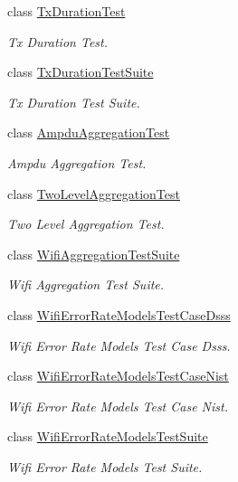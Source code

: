 \begin{DoxyCompactItemize}
class \hyperlink{classTxDurationTest}{Tx\+Duration\+Test}
\begin{DoxyCompactList}\small\item\em Tx Duration Test. \end{DoxyCompactList}\item 
class \hyperlink{classTxDurationTestSuite}{Tx\+Duration\+Test\+Suite}
\begin{DoxyCompactList}\small\item\em Tx Duration Test Suite. \end{DoxyCompactList}\item 
class \hyperlink{classAmpduAggregationTest}{Ampdu\+Aggregation\+Test}
\begin{DoxyCompactList}\small\item\em Ampdu Aggregation Test. \end{DoxyCompactList}\item 
class \hyperlink{classTwoLevelAggregationTest}{Two\+Level\+Aggregation\+Test}
\begin{DoxyCompactList}\small\item\em Two Level Aggregation Test. \end{DoxyCompactList}\item 
class \hyperlink{classWifiAggregationTestSuite}{Wifi\+Aggregation\+Test\+Suite}
\begin{DoxyCompactList}\small\item\em Wifi Aggregation Test Suite. \end{DoxyCompactList}\item 
class \hyperlink{classWifiErrorRateModelsTestCaseDsss}{Wifi\+Error\+Rate\+Models\+Test\+Case\+Dsss}
\begin{DoxyCompactList}\small\item\em Wifi Error Rate Models Test Case Dsss. \end{DoxyCompactList}\item 
class \hyperlink{classWifiErrorRateModelsTestCaseNist}{Wifi\+Error\+Rate\+Models\+Test\+Case\+Nist}
\begin{DoxyCompactList}\small\item\em Wifi Error Rate Models Test Case Nist. \end{DoxyCompactList}\item 
class \hyperlink{classWifiErrorRateModelsTestSuite}{Wifi\+Error\+Rate\+Models\+Test\+Suite}
\begin{DoxyCompactList}\small\item\em Wifi Error Rate Models Test Suite. \end{DoxyCompactList}\item 

\end{DoxyCompactItemize}
